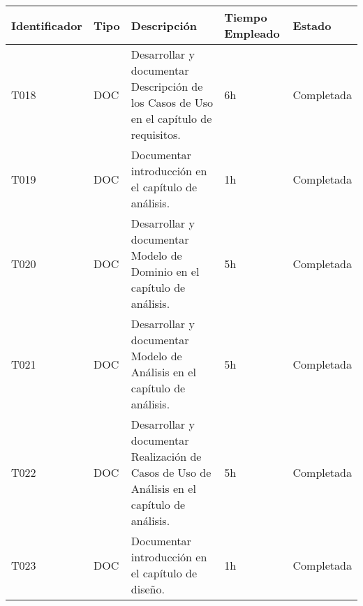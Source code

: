 \begin{table}[]
  \centering
\begin{tabular}{
  |p{}%
  |p{}%
  |p{}
  |p{}
  |p{}
  |%
  }
  \hline
  \textbf{Identificador} & \textbf{Tipo} & \textbf{Descripción}                                             & \textbf{Tiempo Empleado} & \textbf{Estado} \\ \hline
 
  T018                   & DOC           & Desarrollar y documentar Descripción de los Casos de Uso en el capítulo de requisitos.                   & 6h                       & Completada      \\ \hline

  T019                      &    DOC            & Documentar introducción en el capítulo de análisis.                                                                 &         1h                 &          Completada       \\ \hline

  T020                      &    DOC            & Desarrollar y documentar Modelo de Dominio en el capítulo de análisis.                                                                &         5h                 &         Completada        \\ \hline

  T021                      &    DOC            & Desarrollar y documentar Modelo de Análisis en el capítulo de análisis.                                                                &         5h                 &         Completada        \\ \hline

  T022                      &    DOC            & Desarrollar y documentar Realización de Casos de Uso de Análisis en el capítulo de análisis.                                                                &         5h                 &         Completada        \\ \hline


  T023                      &    DOC            & Documentar introducción en el capítulo de diseño.                                                                &        1h                  &           Completada      \\ \hline


\end{tabular}
\end{table}
